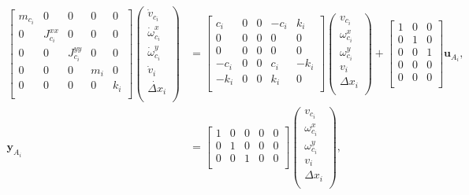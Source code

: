 \begin{equation}
\begin{aligned}
\begin{bmatrix}
m_{c_i} & 0 & 0 & 0 & 0\\
0 & {J}_{c_i}^{xx} & 0 & 0 & 0 \\
0 & 0 & {J}_{c_i}^{yy} & 0 & 0 \\
0 & 0 & 0 & m_i & 0 \\
0 & 0 & 0 & 0 & k_i \\
\end{bmatrix}
\begin{pmatrix}
\dot{v}_{c_i} \\
\dot{\omega}_{c_i}^x \\
\dot{\omega}_{c_i}^y \\
\dot{v}_i \\
\dot{\Delta x}_i \\
\end{pmatrix} &= 
\begin{bmatrix}
c_i & 0 & 0 & -c_i & k_i\\
0 & 0 & 0 & 0 & 0 \\
0 & 0 & 0 & 0 & 0 \\
-c_i & 0 & 0 & c_i & -k_i \\
-k_i & 0 & 0 & k_i & 0 \\
\end{bmatrix}
\begin{pmatrix}
{v}_{c_i} \\
{\omega}_{c_i}^x \\
{\omega}_{c_i}^y \\
{v}_i \\
{\Delta x}_i \\
\end{pmatrix}
+ \begin{bmatrix}
1 & 0 & 0 \\
0 & 1 & 0 \\
0 & 0 & 1 \\
0 & 0 & 0 \\
0 & 0 & 0 \\
\end{bmatrix} \mathbf{u}_{A_i}, \\
\mathbf{y}_{A_i} &= \begin{bmatrix}
1 & 0 & 0 & 0 & 0 \\
0 & 1 & 0 & 0 & 0 \\
0 & 0 & 1 & 0 & 0 \\
\end{bmatrix}
\begin{pmatrix}
{v}_{c_i} \\
{\omega}_{c_i}^x \\
{\omega}_{c_i}^y \\
{v}_i \\
{\Delta x}_i \\
\end{pmatrix},
\end{aligned}
\end{equation}
